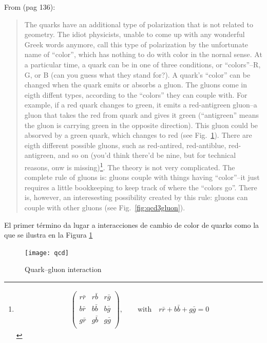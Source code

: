 
From \cite{Feynman:1986er} (pag 136):
\begin{quote}
  The quarks have an additional type of polarization that is not related to geometry. The idiot physicists, unable to come up with any wonderful Greek words anymore, call this type of polarization by the unfortunate name of ``color'', which has nothing to do with color in the nornal sense. At a particular time, a quark can be in one of three conditions, or ``colors''--R, G, or B (can you guess what they stand for?). A quark's ``color'' can be changed when the quark emits or absorbs a gluon. The gluons come in eigth diffent types, according to the ``colors'' they can couple with. For example, if a red quark changes to green, it emits a red-antigreen gluon--a gluon that takes the red from quark and gives it green (``antigreen'' means the gluon is carrying green in the opposite direction). This gluon could be absorved by a green quark, which changes to red (see Fig.~\ref{fig:qcd}). There are eigth different possible gluons, such as red-antired, red-antiblue, red-antigreen, and so on (you'd think there'd be nine, but for technical reasons, onw is missing)\footnote{
    \begin{align*}
      \begin{pmatrix}
        r\bar{r} & r\bar{b} &r\bar{g}\\ 
        b\bar{r} & b\bar{b} &b\bar{g}\\ 
        g\bar{r} & g\bar{b} &g\bar{g}\\ 
      \end{pmatrix},\qquad\text{with}\quad r\bar{r}+b\bar{b}+g\bar{g}=0
    \end{align*}
}. The theory is not very complicated.  The complete rule of gluons is: gluons couple with things having ``color''--it just requires a little bookkeeping to keep track of where the ``colors go''.  There is, however, an interesesting possibility created by this rule: gluons can couple with other gluons (see Fig.~\ref{fig:qcd3gluon}).
\end{quote}


El primer término da lugar a interacciones de cambio de color de quarks como la que se ilustra en la Figura \ref{fig:qcd}
\begin{figure}
  \centering
  \texttt{[image: qcd]} %
  \caption{Quark--gluon interaction}
  \label{fig:qcd}
\end{figure}

